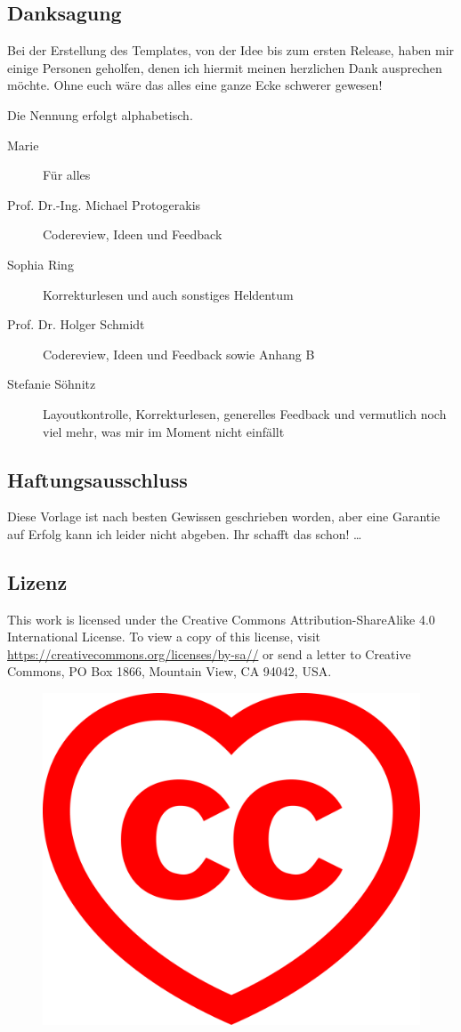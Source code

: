 \subsection{Danksagung}%
\label{sec:thx}
Bei der Erstellung des Templates, von der Idee bis zum ersten Release, haben mir einige Personen geholfen, denen ich hiermit meinen herzlichen Dank ausprechen möchte. Ohne euch wäre das alles eine ganze Ecke schwerer gewesen! 

Die Nennung erfolgt alphabetisch.
\begin{description}
  \item[Marie] Für alles
  \item[Prof. Dr.-Ing. Michael Protogerakis] Codereview, Ideen und Feedback
  \item[Sophia Ring] Korrekturlesen und auch sonstiges Heldentum
  \item[Prof. Dr. Holger Schmidt] Codereview, Ideen und Feedback sowie Anhang B
  \item[Stefanie Söhnitz] Layoutkontrolle, Korrekturlesen, generelles Feedback und vermutlich noch viel mehr, was mir im Moment nicht einfällt
\end{description}%
\subsection{Haftungsausschluss}%
\label{sec:haftausschl}
Diese Vorlage ist nach besten Gewissen geschrieben worden, aber eine Garantie auf Erfolg kann ich leider nicht abgeben. Ihr schafft das schon!
\dots%
\subsection{Lizenz}%
\label{sec:licence}
This work is licensed under the Creative Commons Attribution-ShareAlike 4.0 International License. To view a copy of this license, visit \href{https://creativecommons.org/licenses/by-sa/4.0/}{https://creativecommons.org/\-licenses/\-by-sa//} or send a letter to Creative Commons, PO Box 1866, Mountain View, CA 94042, USA.
\begin{figure}[hb]
  \centering
  \includegraphics[width=0.7\columnwidth]{graphics/ccheart_red.pdf}
\end{figure}%
